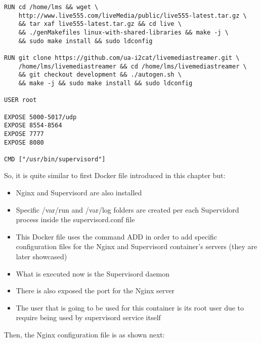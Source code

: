 \begin{verbatim}
RUN cd /home/lms && wget \
	http://www.live555.com/liveMedia/public/live555-latest.tar.gz \
	&& tar xaf live555-latest.tar.gz && cd live \
	&& ./genMakefiles linux-with-shared-libraries && make -j \
	&& sudo make install && sudo ldconfig

RUN git clone https://github.com/ua-i2cat/livemediastreamer.git \
	/home/lms/livemediastreamer && cd /home/lms/livemediastreamer \
	&& git checkout development && ./autogen.sh \
	&& make -j && sudo make install && sudo ldconfig

USER root

EXPOSE 5000-5017/udp
EXPOSE 8554-8564
EXPOSE 7777
EXPOSE 8080

CMD ["/usr/bin/supervisord"] 
\end{verbatim}

So, it is quite similar to first Docker file introduced in this chapter but:

\begin{itemize}
\item Nginx and Supervisord are also installed
\item Specific /var/run and /var/log folders are created per each Supervidord process inside the supervisord.conf file
\item This Docker file uses the command ADD in order to add specific configuration files for the Nginx and Supervisord container's servers (they are later showcased)
\item What is executed now is the Supervisord daemon
\item There is also exposed the port for the Nginx server
\item The user that is going to be used for this container is its root user due to require being used by supervisord service itself
\end{itemize}

Then, the Nginx configuration file is as shown next:

